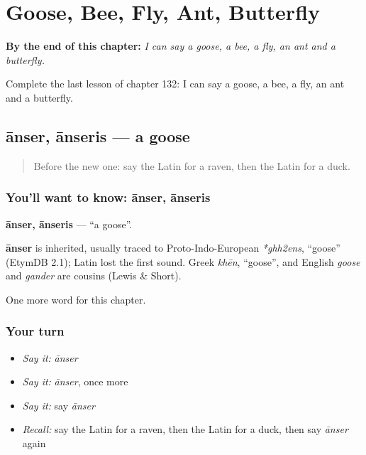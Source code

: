 
\chapter{Goose, Bee, Fly, Ant, Butterfly}
\label{ch:la-goose-bee-fly-ant-butterfly}

\begin{chapteropening}
\textbf{By the end of this chapter:} \emph{I can say a goose, a bee, a fly, an ant and a butterfly.}

Complete the last lesson of chapter 132: I can say a goose, a bee, a fly, an ant and a butterfly.
\end{chapteropening}

\section[ānser, ānseris]{ānser, ānseris — a goose}

\label{lesson:LA-C132-anser}



\begin{quote}
Before the new one: say the Latin for a raven, then the Latin for a duck.
\end{quote}

\subsection*{You'll want to know: ānser, ānseris}
\textbf{ānser, ānseris} — \textquotedblleft{}a goose\textquotedblright{}.

\begin{cousinweb}
\textbf{ānser} is inherited, usually traced to Proto-Indo-European \emph{*ghh2ens}, \textquotedblleft{}goose\textquotedblright{} (EtymDB 2.1); Latin lost the first sound. Greek \emph{khēn}, \textquotedblleft{}goose\textquotedblright{}, and English \emph{goose} and \emph{gander} are cousins (Lewis \& Short).
\end{cousinweb}

\begin{grammarlens}[title={What you've built}]
One more word for this chapter.
\end{grammarlens}

\subsection*{Your turn}
\begin{itemize}
\raggedright
  \item \emph{Say it:} \emph{ānser}
  \item \emph{Say it:} \emph{ānser}, once more
  \item \emph{Say it:} say \emph{ānser}
  \item \emph{Recall:} say the Latin for a raven, then the Latin for a duck, then say \emph{ānser} again
\end{itemize}

